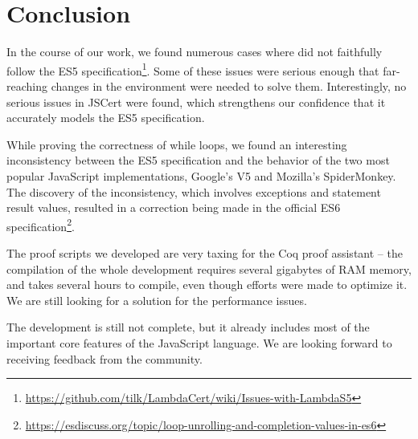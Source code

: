 \documentclass{sigplanconf}
\begin{document}
\section{Conclusion}

In the course of our work, we found numerous cases where
\lambdajs{} did not faithfully follow the ES5 
specification\footnote{\url{https://github.com/tilk/LambdaCert/wiki/Issues-with-LambdaS5}}.
Some of these issues were serious enough that
far-reaching changes in the \lambdajs{} environment were needed
to solve them. Interestingly, no serious issues in JSCert were
found, which strengthens our confidence that it accurately models
the ES5 specification.

While proving the correctness of while loops, we found an interesting
inconsistency between the ES5 specification and the behavior
of the two most popular JavaScript implementations, Google's V5 and
Mozilla's SpiderMonkey. The discovery of the inconsistency,
which involves exceptions and statement result values,
resulted in a correction being made in the official ES6
specification\footnote{\url{https://esdiscuss.org/topic/loop-unrolling-and-completion-values-in-es6}}.

The proof scripts we developed are very taxing for the Coq
proof assistant -- the compilation of the whole development
requires several gigabytes of RAM memory, and takes several
hours to compile, even though efforts were made to optimize it.
We are still looking for a solution for the performance issues.

The development is still not complete, but it already
includes most of the important core features of the
JavaScript language. We are looking forward to receiving
feedback from the community.













\end{document}
